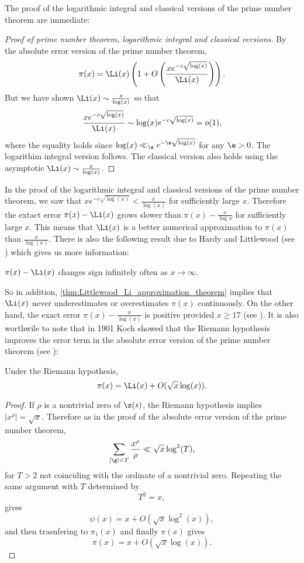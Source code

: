       The proof of the logarithmic integral and classical versions of the prime number theorem are immediate:

      \begin{proof}[Proof of prime number theorem, logarithmic integral and classical versions]
        By the absolute error version of the prime number theorem,
        \[
          \pi(x) = \Li(x)\left(1+O\left(\frac{xe^{-c\sqrt{\log(x)}}}{\Li(x)}\right)\right).
        \]
        But we have shown $\Li(x) \sim \frac{x}{\log(x)}$ so that
        \[
          \frac{xe^{-c\sqrt{\log(x)}}}{\Li(x)} \sim \log(x)e^{-c\sqrt{\log(x)}} = o(1),
        \]
        where the equality holds since $\log(x) \ll_{\e} e^{-\e\sqrt{\log(x)}}$ for any $\e > 0$. The logarithim integral version follows. The classical version also holds using the asymptotic $\Li(x) \sim \frac{x}{\log(x)}$.
      \end{proof}
      
      In the proof of the logarithmic integral and classical versions of the prime number theorem, we saw that $xe^{-c\sqrt{\log(x)}} < \frac{x}{\log(x)}$ for sufficiently large $x$. Therefore the extact error $\pi(x)-\Li(x)$ grows slower than $\pi(x)-\frac{x}{\log{x}}$ for sufficiently large $x$. This means that $\Li(x)$ is a better numerical approximation to $\pi(x)$ than $\frac{x}{\log(x)}$. There is also the following result due to Hardy and Littlewood (see \cite{hardy1916contributions}) which gives us more information:

      \begin{proposition}\label{thm:Littlewood_Li_approximation_theorem}
        $\pi(x)-\Li(x)$ changes sign infinitely often as $x \to \infty$.
      \end{proposition}

      So in addition, \cref{thm:Littlewood_Li_approximation_theorem} implies that $\Li(x)$ never underestimates or overestimates $\pi(x)$ continuously. On the other hand, the exact error $\pi(x)-\frac{x}{\log(x)}$ is positive provided $x \ge 17$ (see \cite{rosser1962approximate}). It is also worthwile to note that in 1901 Koch showed that the Riemann hypothesis improves the error term in the absolute error version of the prime number theorem (see \cite{von1901distribution}):

      \begin{proposition}
        Under the Riemann hypothesis,
        \[
          \pi(x) = \Li(x)+O(\sqrt{x}\log(x)).
        \]
      \end{proposition}
      \begin{proof}
        If $\rho$ is a nontrivial zero of $\z(s)$, the Riemann hypothesis implies $|x^{\rho}| = \sqrt{x}$. Therefore as in the proof of the absolute error version of the prime number theorem,
        \[
          \sum_{|\g| < T}\frac{x^{\rho}}{\rho} \ll \sqrt{x}\log^{2}(T),
        \]
        for $T > 2$ not coinciding with the ordinate of a nontrivial zero. Repeating the same argument with $T$ determined by
        \[
          T^{2} = x,
        \]
        gives
        \[
          \psi(x) = x+O(\sqrt{x}\log^{2}(x)),
        \]
        and then trasnfering to $\pi_{1}(x)$ and finally $\pi(x)$ gives
        \[
          \pi(x) = x+O(\sqrt{x}\log(x)).
        \]
      \end{proof}

